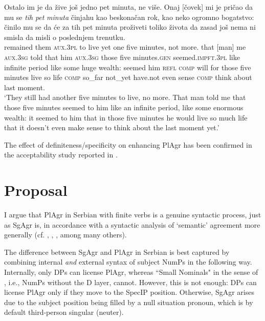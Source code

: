\documentclass[output=paper,colorlinks,citecolor=brown
]{langscibook}
\begin{document}
\ea \label{ex:imperfectum}
\gll Ostalo im je da žive još jedno pet minuta, ne više. Onaj [čovek] mi je pričao da mu se \textit{tih} \textit{pet} \textit{minuta} činjahu kao beskonačan rok, kao neko ogromno bogatstvo: činilo mu se da će za tih pet minuta proživeti toliko života da zasad još nema ni smisla da misli o poslednjem trenutku. \\
remained them \textsc{aux}.3\textsc{pl} to live yet one five minutes, not more. that [man] me \textsc{aux}.3\textsc{sg} told that him \textsc{aux}.3\textsc{sg} those five minutes.\textsc{gen} seemed.\textsc{impft.3pl} like infinite period like some huge wealth: seemed him \textsc{refl} \textsc{comp} will for those five minutes live so life \textsc{comp} so\_far not\_yet have.not even sense \textsc{comp} think about last moment.\\
\glt `They still had another five minutes to live, no more. That man told me that those five minutes seemed to him like an infinite period, like some enormous wealth: it seemed to him that in those five minutes he would live so much life that it doesn’t even make sense to think about the last moment yet.'
\z

\noindent The effect of definiteness/specificity on enhancing PlAgr has been confirmed in the acceptability study reported in \citet{Milosavljevic2018nasledje}.



\section{Proposal} \label{sect:proposal}

I argue that PlAgr in Serbian with finite verbs is a genuine syntactic process, just as SgAgr is, in accordance with a syntactic analysis of ‘semantic’ agreement more generally (cf. \citealt{Pereltsvaig2006}, \citealt{Danon2013}, \citealt{Wurmbrand2017}, among many others).

The difference between SgAgr and PlAgr in Serbian is best captured by combining internal \textit{and} external syntax of subject NumPs in the following way. Internally, only DPs can license PlAgr, whereas ``Small Nominals" in the sense of \citet{Pereltsvaig2006}, i.e., NumPs without the D layer, cannot. However, this is not enough: DPs can license PlAgr only if they move to the SpecIP position. Otherwise, SgAgr arises due to the subject position being filled by a null situation pronoun, which is by default third-person singular (neuter).
\end{document}
